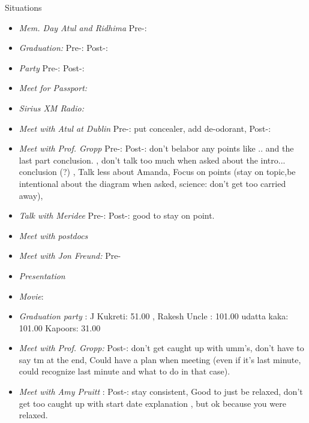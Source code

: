 \documentclass[serif, mathserif, final]{beamer}
\begin{document}
\begin{frame}{}
\begin{columns}
\begin{column}{0.20\linewidth}
\begin{block}{Situations}
\begin{itemize}
        \item \tiny \textit{Mem. Day Atul and Ridhima} Pre-: 


        \item \tiny \textit{Graduation:} Pre-:   Post-: 
        \item \tiny \textit{Party } Pre-:  Post-: 


          \item \tiny \textit{Meet for Passport:} 
          \item \tiny \textit{Sirius XM Radio:} 
          \item \tiny \textit{Meet with Atul at Dublin} Pre-: put concealer, add de-odorant, Post-:  

          \item \tiny \textit{Meet with Prof. Gropp} Pre-:  Post-:
            don't belabor any points like .. and the last part
            conclusion. , don't talk too much when asked about the
            intro... conclusion (?) ,
            Talk less about Amanda, Focus on points (stay on
            topic,be intentional about the diagram when asked,
            science: don't get too carried away),
          \item \tiny \textit{Talk with Meridee} Pre-:  Post-:
            good to stay on point.
            
          \item \tiny \textit{Meet with postdocs}
          \item \tiny \textit{Meet with Jon Freund:} Pre- 
          \item \tiny \textit{Presentation} 
            
          \item \tiny \textit{Movie}: 

          \item \tiny \textit{ Graduation party }:  J Kukreti: 51.00 ,
            Rakesh Uncle : 101.00 
            udatta kaka: 101.00
            Kapoors: 31.00

          \item \tiny \textit{Meet with Prof. Gropp: } Post-:
                 don't get caught up with umm's, don't have to say tm
                 at the end, Could have a plan when meeting (even if
                 it's last minute, could recognize last minute and what to
                 do in that case). 

               \item \tiny \textit{Meet with Amy Pruitt} : Post-:
                 stay consistent, Good to just be relaxed, don't get
                 too caught up with start date explanation , but ok
                 because you were relaxed. 


\end{itemize}
\end{block}
\end{column}
\end{columns}
\end{frame}
\end{document}
